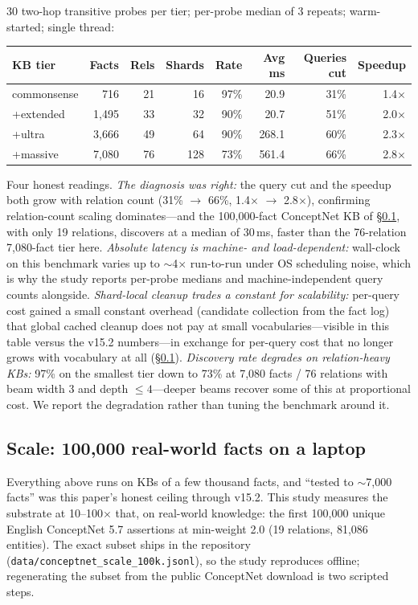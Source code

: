 \documentclass[11pt]{article}
\begin{document}
30 two-hop transitive probes per tier; per-probe median of 3
repeats; warm-started; single thread:

\begin{center}
\small
\begin{tabular}{lrrrrrrr}
\toprule
KB tier & Facts & Rels & Shards & Rate & Avg ms & Queries cut & Speedup \\
\midrule
commonsense & 716 & 21 & 16 & 97\% & 20.9 & 31\% & 1.4$\times$ \\
+extended & 1{,}495 & 33 & 32 & 90\% & 20.7 & 51\% & 2.0$\times$ \\
+ultra & 3{,}666 & 49 & 64 & 90\% & 268.1 & 60\% & 2.3$\times$ \\
+massive & 7{,}080 & 76 & 128 & 73\% & 561.4 & 66\% & 2.8$\times$ \\
\bottomrule
\end{tabular}
\end{center}

Four honest readings. \emph{The diagnosis was right:} the query cut
and the speedup both grow with relation count (31\% $\to$ 66\%,
1.4$\times$ $\to$ 2.8$\times$), confirming relation-count scaling
dominates---and the 100{,}000-fact ConceptNet KB of
\S\ref{sec:scale}, with only 19 relations, discovers at a median of
30\,ms, faster than the 76-relation 7{,}080-fact tier here.
\emph{Absolute latency is machine- and load-dependent:} wall-clock
on this benchmark varies up to $\sim$4$\times$ run-to-run under OS
scheduling noise, which is why the study reports per-probe medians
and machine-independent query counts alongside. \emph{Shard-local
cleanup trades a constant for scalability:} per-query cost gained a
small constant overhead (candidate collection from the fact log)
that global cached cleanup does not pay at small
vocabularies---visible in this table versus the v15.2
numbers---in exchange for per-query cost that no longer grows with
vocabulary at all (\S\ref{sec:scale}). \emph{Discovery rate degrades
on relation-heavy KBs:} 97\% on the smallest tier down to 73\% at
7{,}080 facts / 76 relations with beam width 3 and depth $\leq
4$---deeper beams recover some of this at proportional cost. We
report the degradation rather than tuning the benchmark around it.

\subsection{Scale: 100{,}000 real-world facts on a laptop}
\label{sec:scale}

Everything above runs on KBs of a few thousand facts, and ``tested
to $\sim$7{,}000 facts'' was this paper's honest ceiling through
v15.2. This study measures the substrate at 10--100$\times$ that,
on real-world knowledge: the first 100{,}000 unique English
ConceptNet 5.7 assertions at min-weight 2.0 (19 relations, 81{,}086
entities). The exact subset ships in the repository
(\texttt{data/conceptnet\_scale\_100k.jsonl}), so the study
reproduces offline; regenerating the subset from the public
ConceptNet download is two scripted steps.
\end{document}

